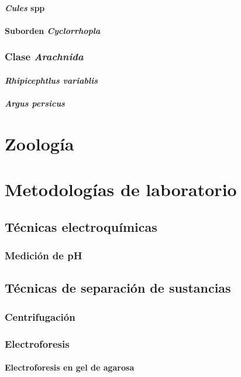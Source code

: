 \documentclass[10pt,a4paper,onecolumn,openany]{book}
\begin{document}
\subsection{\textit{Cules} spp}
\subsection{Suborden \textit{Cyclorrhopla}} %
\section{Clase \textit{Arachnida}}
\subsection{\textit{Rhipicephtlus variablis}}
\subsection{\textit{Argus persicus}}
\part{Zoología}
\part{Metodologías de laboratorio}
\chapter{Técnicas electroquímicas}
\section{Medición de pH}
\chapter{Técnicas de separación de sustancias}
\section{Centrifugación}
\section{Electroforesis}
\subsection{Electroforesis en gel de agarosa}
\end{document}
